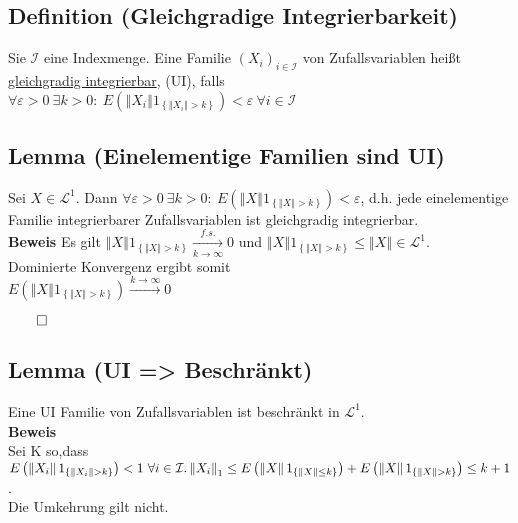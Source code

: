 \documentclass[german,10pt,oneside, fleqn, a4paper]{article}
\newcommand {\N}	{\mathbb{N}}
\newcommand{\brc}[1]{\left(#1\right)}
\newcommand{\brac}[1]{\left\lbrace #1\right\rbrace}
\newcommand{\folge}[3][\N]{\left(#2_#3\right)_{#3\in #1}}
\newcommand{\norm}[1]{\left\Vert #1 \right\Vert}
\newcommand{\QED}{\begin{flushright}$\qed$\end{flushright}}
\newcommand{\mc}[1]{\mathcal{#1}}
\newcommand{\lp}[1]{\mc{L}^{#1}}
\newcommand{\beweis}{\textbf{Beweis}\\}
\newcommand{\1}[1]{1_{#1}}
\newcommand{\2}[1]{\1{\brac{#1}}}
\begin{document}
\subsection{Definition (Gleichgradige Integrierbarkeit)}
Sie $\mc{I}$ eine Indexmenge. Eine Familie $\folge[\mc{I}]{X}{i}$ von Zufallsvariablen heißt \underline{gleichgradig integrierbar}, (UI), falls\\ $\forall\varepsilon>0\ \exists k>0:\ E\brc{\norm{X_i}1_{\brac{\norm{X_i}>k}}}<\varepsilon\ \forall i\in\mc{I}$

\subsection{Lemma (Einelementige Familien sind UI)}
Sei $X\in\mc{L}^1$. Dann $\forall\varepsilon>0\ \exists k>0:\ E\brc{\norm{X}1_{\brac{\norm{X}>k}}}<\varepsilon$, d.h. jede einelementige Familie integrierbarer Zufallsvariablen ist gleichgradig integrierbar.\\
\textbf{Beweis}
Es gilt $\norm{X}1_{\brac{\norm{X}>k}}\xrightarrow[k\rightarrow\infty]{f.s.}0$ und $\norm{X}1_{\brac{\norm{X}>k}}\leq \norm{X}\in\lp{1}$. \\
Dominierte Konvergenz ergibt somit \\
$E\brc{\norm{X}1_{\brac{\norm{X}>k}}}\xrightarrow{k\rightarrow\infty}0$\QED

\subsection{Lemma (UI => Beschränkt)}
\label{2.13}
Eine UI Familie von Zufallsvariablen ist beschränkt in $\lp{1}$.\\
\beweis
Sei K so,dass $E\brc{\norm{X_i}1_{\brac{\norm{X_i}>k}}}<1\ \forall i\in\mc{I}.\\
\norm{X_i}_1\leq E\brc{\norm{X}1_{\brac{\norm{X}\leq k}}}+E\brc{\norm{X}1_{\brac{\norm{X}>k}}}\leq k+1$.\\
Die Umkehrung gilt nicht.
\end{document}
